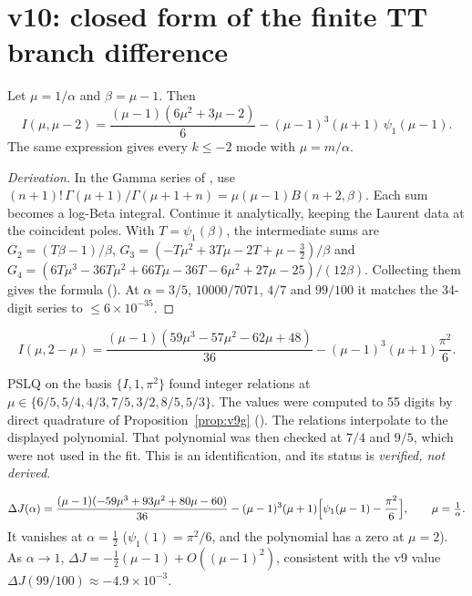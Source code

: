 \section{v10: closed form of the finite TT branch difference}
\label{sec:v10dJ}

\begin{proposition}
\label{prop:v10ICR}
Let \(\mu=1/\alpha\) and \(\beta=\mu-1\). Then
\[
 I(\mu,\mu-2)=\frac{(\mu-1)(6\mu^2+3\mu-2)}6-(\mu-1)^3(\mu+1)\,\psi_1(\mu-1).
\]
The same expression gives every \(k\le-2\) mode with \(\mu=m/\alpha\).
\end{proposition}

\begin{proof}[Derivation]
In the Gamma series of , use
\((n+1)!\,\Gamma(\mu+1)/\Gamma(\mu+1+n)=\mu(\mu-1)B(n+2,\beta)\).
Each sum becomes a log-Beta integral. Continue it analytically,
keeping the Laurent data at the coincident poles. With
\(T=\psi_1(\beta)\), the intermediate sums are
\(G_2=(T\beta-1)/\beta\),
\(G_3=(-T\mu^2+3T\mu-2T+\mu-\tfrac32)/\beta\) and
\(G_4=(6T\mu^3-36T\mu^2+66T\mu-36T-6\mu^2+27\mu-25)/(12\beta)\).
Collecting them gives the formula
(). At \(\alpha=3/5\),
\(10000/7071\), \(4/7\) and \(99/100\) it matches the 34-digit
series to \(\le6\times10^{-35}\).
\end{proof}

\begin{proposition}
\label{prop:v10IF}
\[
 I(\mu,2-\mu)=\frac{(\mu-1)(59\mu^3-57\mu^2-62\mu+48)}{36}-(\mu-1)^3(\mu+1)\frac{\pi^2}6 .
\]
\end{proposition}
PSLQ \cite{PSLQ} on the basis \(\{I,1,\pi^2\}\) found integer relations at
\(\mu\in\{6/5,5/4,4/3,7/5,3/2,8/5,5/3\}\). The values were computed
to 55 digits by direct quadrature of Proposition~\ref{prop:v9g}
(). The relations interpolate to the
displayed polynomial. That polynomial was then checked at \(7/4\)
and \(9/5\), which were not used in the fit.
This is an identification, and its status is \emph{verified, not
derived}.

\begin{corollary}
\label{cor:v10dJ}
\[
 \Delta J(\alpha)=\frac{(\mu-1)(-59\mu^3+93\mu^2+80\mu-60)}{36}
 -(\mu-1)^3(\mu+1)\Bigl[\psi_1(\mu-1)-\frac{\pi^2}6\Bigr],\qquad \mu=\tfrac1\alpha .
\]
It vanishes at \(\alpha=\tfrac12\) (\(\psi_1(1)=\pi^2/6\), and the
polynomial has a zero at \(\mu=2\)). As \(\alpha\to1\),
\(\Delta J=-\tfrac12(\mu-1)+O((\mu-1)^2)\), consistent with the v9
value \(\Delta J(99/100)\approx-4.9\times10^{-3}\).
\end{corollary}

